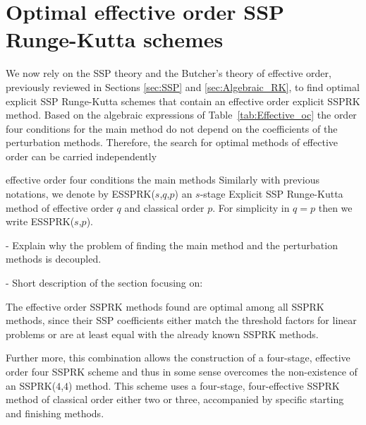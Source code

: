 \section{Optimal effective order SSP Runge-Kutta schemes}\label{sec:Optimal_ESSPRK}

\indent We now rely on the SSP theory and the Butcher's theory of effective order, previously reviewed in Sections \ref{sec:SSP} and \ref{sec:Algebraic_RK}, to find optimal explicit SSP Runge-Kutta schemes that contain an effective order explicit SSPRK method. Based on the algebraic expressions of Table~\ref{tab:Effective_oc} the order four conditions for the main method do not depend on the coefficients of the perturbation methods. Therefore, the search for optimal methods of effective order can be carried independently 


effective order four conditions the main methods Similarly with previous notations, we denote by ESSPRK($s$,$q$,$p$) an $s$-stage Explicit SSP Runge-Kutta method of effective order $q$ and classical order $p$. For simplicity in $q=p$ then we write ESSPRK($s$,$p$). 

- Explain why the problem of finding the main method and the perturbation methods is decoupled.

- Short description of the section focusing on: 







The effective order SSPRK methods found are optimal among all SSPRK methods, since their SSP coefficients either match the threshold factors for linear problems  or are at least equal with the already known SSPRK methods. 


Further more, this combination allows the construction of a
four-stage, effective order four SSPRK scheme and thus in some sense overcomes the
non-existence of an SSPRK(\( 4 \),\( 4 \)) method.  This scheme uses a
four-stage, four-effective SSPRK method of classical order either two
or three, accompanied by specific starting and finishing methods.


